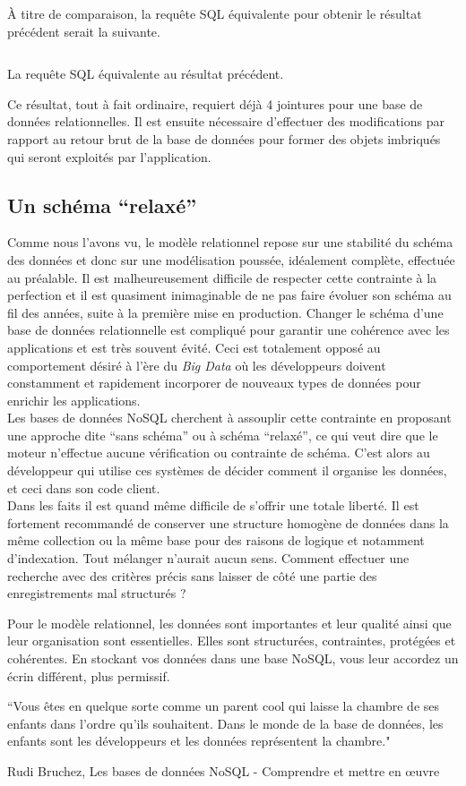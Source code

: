 	À titre de comparaison, la requête SQL équivalente pour obtenir le résultat précédent serait la suivante.
	\begin{listing}[H]
		\inputminted{sql}{code/commentaireSQL.sql}
		\caption{La requête SQL équivalente au résultat précédent.}
	\end{listing}
	Ce résultat, tout à fait ordinaire, requiert déjà 4 jointures pour une base de données relationnelles. Il est ensuite nécessaire d'effectuer des modifications par rapport au retour brut de la base de données pour former des objets imbriqués qui seront exploités par l'application.

\subsection{Un schéma \enquote{relaxé}}
	Comme nous l'avons vu, le modèle relationnel repose sur une stabilité du schéma des données et donc sur une modélisation poussée, idéalement complète, effectuée au préalable. Il est malheureusement difficile de respecter cette contrainte à la perfection et il est quasiment inimaginable de ne pas faire évoluer son schéma au fil des années, suite à la première mise en production. Changer le schéma d'une base de données relationnelle est compliqué pour garantir une cohérence avec les applications et est très souvent évité. Ceci est totalement opposé au comportement désiré à l'ère du \textit{Big Data} où les développeurs doivent constamment et rapidement incorporer de nouveaux types de données pour enrichir les applications.\\

	Les bases de données NoSQL cherchent à assouplir cette contrainte en proposant une approche dite \enquote{sans schéma} ou à schéma \enquote{relaxé}, ce qui veut dire que le moteur n'effectue aucune vérification ou contrainte de schéma. C'est alors au développeur qui utilise ces systèmes de décider comment il organise les données, et ceci dans son code client.\\

	Dans les faits il est quand même difficile de s'offrir une totale liberté. Il est fortement recommandé de conserver une structure homogène de données dans la même collection ou la même base pour des raisons de logique et notamment d'indexation. Tout mélanger n'aurait aucun sens. Comment effectuer une recherche avec des critères précis sans laisser de côté une partie des enregistrements mal structurés ?

	Pour le modèle relationnel, les données sont importantes et leur qualité ainsi que leur organisation sont essentielles. Elles sont structurées, contraintes, protégées et cohérentes. En stockant vos données dans une base NoSQL, vous leur accordez un écrin différent, plus permissif.
	\epigraph{``Vous êtes en quelque sorte comme un parent cool qui laisse la chambre de ses enfants dans l'ordre qu'ils souhaitent. Dans le monde de la base de données, les enfants sont les développeurs et les données représentent la chambre."}{\textup{Rudi Bruchez}, Les bases de données NoSQL - Comprendre et mettre en œuvre \cite{BD_NoSQL}}
